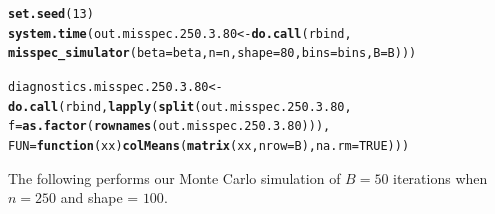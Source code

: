 \documentclass[11pt]{article}\usepackage[]{graphicx}\usepackage[]{color}
\makeatletter
\newcommand{\hlnum}[1]{\textcolor[rgb]{0.686,0.059,0.569}{#1}}%
\newcommand{\hlstd}[1]{\textcolor[rgb]{0.345,0.345,0.345}{#1}}%
\newcommand{\hlkwa}[1]{\textcolor[rgb]{0.161,0.373,0.58}{\textbf{#1}}}%
\newcommand{\hlkwb}[1]{\textcolor[rgb]{0.69,0.353,0.396}{#1}}%
\newcommand{\hlkwc}[1]{\textcolor[rgb]{0.333,0.667,0.333}{#1}}%
\newcommand{\hlkwd}[1]{\textcolor[rgb]{0.737,0.353,0.396}{\textbf{#1}}}%
\newenvironment{kframe}{%
 \def\at@end@of@kframe{}%
 \ifinner\ifhmode%
  \def\at@end@of@kframe{\end{minipage}}%
  \begin{minipage}{\columnwidth}%
 \fi\fi%
 \def\FrameCommand##1{\hskip\@totalleftmargin \hskip-\fboxsep
 \colorbox{shadecolor}{##1}\hskip-\fboxsep
     \hskip-\linewidth \hskip-\@totalleftmargin \hskip\columnwidth}%
 \MakeFramed {\advance\hsize-\width
   \@totalleftmargin\z@ \linewidth\hsize
   \@setminipage}}%
 {\par\unskip\endMakeFramed%
 \at@end@of@kframe}
\newenvironment{knitrout}{}{} %
\makeatother
\begin{document}
\begin{knitrout}
\color{fgcolor}\begin{kframe}
\begin{alltt}
\hlkwd{set.seed}\hlstd{(}\hlnum{13}\hlstd{)}
\hlkwd{system.time}\hlstd{(out.misspec.250.3.80} \hlkwb{<-} \hlkwd{do.call}\hlstd{(rbind,}
  \hlkwd{misspec_simulator}\hlstd{(}\hlkwc{beta} \hlstd{= beta,} \hlkwc{n} \hlstd{= n,} \hlkwc{shape} \hlstd{=} \hlnum{80}\hlstd{,} \hlkwc{bins} \hlstd{= bins,} \hlkwc{B} \hlstd{= B)))}
\end{alltt}


{\ttfamily\noindent\bfseries\color{errorcolor}{\#\# Error in chol.default(crossprod(x) + lambda[j] * diag(v)): the leading minor of order 5 is not positive definite}}

{\ttfamily\noindent\itshape\color{messagecolor}{\#\# Timing stopped at: 0.188 0 0.189}}\begin{alltt}
\hlstd{diagnostics.misspec.250.3.80} \hlkwb{<-} \hlkwd{do.call}\hlstd{(rbind,} \hlkwd{lapply}\hlstd{(}\hlkwd{split}\hlstd{(out.misspec.250.3.80,}
  \hlkwc{f} \hlstd{=} \hlkwd{as.factor}\hlstd{(}\hlkwd{rownames}\hlstd{(out.misspec.250.3.80))),}
  \hlkwc{FUN} \hlstd{=} \hlkwa{function}\hlstd{(}\hlkwc{xx}\hlstd{)} \hlkwd{colMeans}\hlstd{(}\hlkwd{matrix}\hlstd{(xx,} \hlkwc{nrow} \hlstd{= B),} \hlkwc{na.rm} \hlstd{=} \hlnum{TRUE}\hlstd{)))}
\end{alltt}


{\ttfamily\noindent\bfseries\color{errorcolor}{\#\# Error in split(out.misspec.250.3.80, f = as.factor(rownames(out.misspec.250.3.80))): object 'out.misspec.250.3.80' not found}}\end{kframe}
\end{knitrout}


The following performs our Monte Carlo simulation of $B = 50$ iterations 
when $n = 250$ and shape = $100$.
\end{document}
